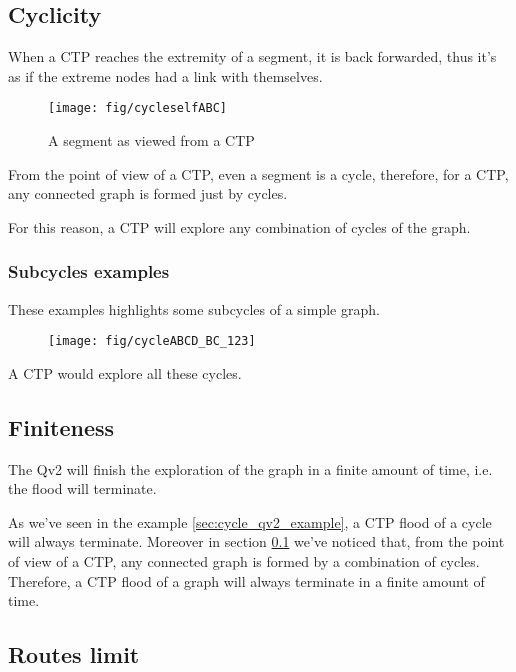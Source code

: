 \documentclass[a4paper]{article}
\begin{document}
\newpage
\subsection{Cyclicity}
\label{sec:CTP_ciclicity}
When a CTP reaches the extremity of a segment, it is back forwarded, thus it's
as if the extreme nodes had a link with themselves.

\begin{figure}[h]
	\begin{center}
		\texttt{[image: fig/cycleselfABC]}
	\end{center}
	\caption{A segment as viewed from a CTP}
	\label{fig:CTP_segment}
\end{figure}

From the point of view of a CTP, even a segment is a cycle, therefore, for a
CTP, any connected graph is formed just by cycles.

For this reason, a CTP will explore any combination of cycles of the graph.

\subsubsection{Subcycles examples}
These examples highlights some subcycles of a simple graph.

\begin{figure}[h]
	\begin{center}
		\texttt{[image: fig/cycleABCD\_BC\_123]}
	\end{center}
\end{figure}
A CTP would explore all these cycles.

\subsection{Finiteness}
The Qv2 will finish the exploration of the graph in a finite amount of time,
i.e. the flood will terminate.

As we've seen in the example \ref{sec:cycle_qv2_example}, a CTP flood of a
cycle will always terminate. Moreover in section \ref{sec:CTP_ciclicity} we've
noticed that, from the point of view of a CTP, any connected graph is formed
by a combination of cycles. Therefore, a CTP flood of a graph will always
terminate in a finite amount of time.

\subsection{Routes limit}
\label{sec:routes_limit}
\end{document}
